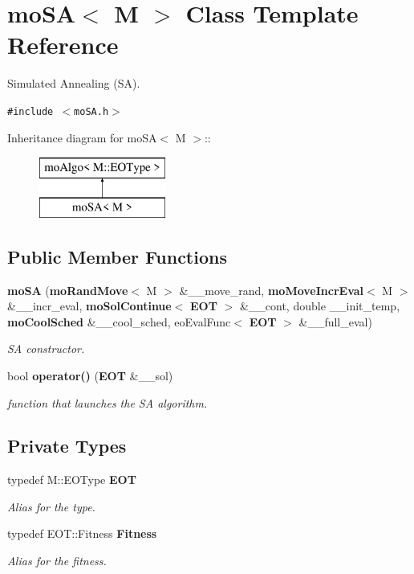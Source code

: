 \section{mo\-SA$<$ M $>$ Class Template Reference}
\label{classmo_s_a}
Simulated Annealing (SA).  


{\tt \#include $<$mo\-SA.h$>$}

Inheritance diagram for mo\-SA$<$ M $>$::\begin{figure}[H]
\begin{center}
\leavevmode
\includegraphics[height=2cm]{classmo_s_a}
\end{center}
\end{figure}
\subsection*{Public Member Functions}
\begin{CompactItemize}
\item 
{\bf mo\-SA} ({\bf mo\-Rand\-Move}$<$ M $>$ \&\_\-\_\-move\_\-rand, {\bf mo\-Move\-Incr\-Eval}$<$ M $>$ \&\_\-\_\-incr\_\-eval, {\bf mo\-Sol\-Continue}$<$ {\bf EOT} $>$ \&\_\-\_\-cont, double \_\-\_\-init\_\-temp, {\bf mo\-Cool\-Sched} \&\_\-\_\-cool\_\-sched, eo\-Eval\-Func$<$ {\bf EOT} $>$ \&\_\-\_\-full\_\-eval)
\begin{CompactList}\small\item\em SA constructor. \item\end{CompactList}\item 
bool {\bf operator()} ({\bf EOT} \&\_\-\_\-sol)
\begin{CompactList}\small\item\em function that launches the SA algorithm. \item\end{CompactList}\end{CompactItemize}
\subsection*{Private Types}
\begin{CompactItemize}
\item 
typedef M::EOType {\bf EOT}\label{classmo_s_a_d5d64a8797bdedc7b3af7893aded0bd5}

\begin{CompactList}\small\item\em Alias for the type. \item\end{CompactList}\item 
typedef EOT::Fitness {\bf Fitness}\label{classmo_s_a_97f1a40d5ab5a0b3f878d0347b34804b}

\begin{CompactList}\small\item\em Alias for the fitness. \item\end{CompactList}\end{CompactItemize}
